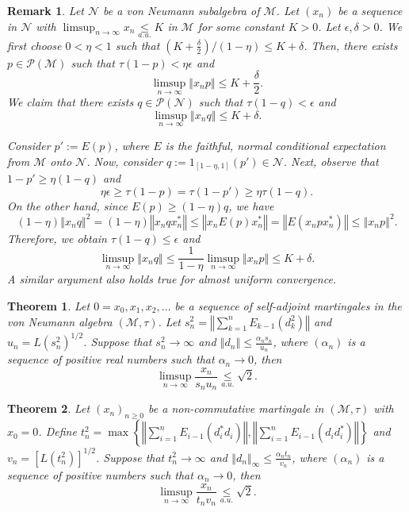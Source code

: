 \documentclass[10pt,a4paper]{amsart}
\newtheorem{rem}{Remark}
\newtheorem{thm}{Theorem}
\newcommand{\CM}{\mathcal{M}}
\newcommand{\CN}{\mathcal{N}}
\newcommand{\CP}{\mathcal{P}}
\newcommand{\auleq}{\underset{a.u.}{\leq }}
\newcommand{\norm}[1]{\left\Vert#1\right\Vert}
\begin{document}
\begin{rem}\label{rem: indep of ambient vna}
Let $\CN$ be a von Neumann subalgebra of $\CM$. Let $(x_n)$ be a sequence in $\CN$ with $\limsup_{n \to \infty} x_n \auleq K $ in $\CM$ for some constant $K>0$. Let $\epsilon, \delta>0$. We first choose $0< \eta <1$ such that $(K+ \frac{\delta}{2})/ (1-\eta) \leq K+ \delta$. Then, there exists $p \in \CP(\CM)$ such that $\tau(1-p)< \eta \epsilon$ and 
\[
\limsup_{n \to \infty} \norm{x_np} \leq K + \frac{\delta}{2}.
\]
We claim that there exists $q \in \CP(\CN)$ such that $\tau(1-q)< \epsilon$ and 
\[
\limsup_{n \to \infty} \norm{x_nq} \leq K + \delta.
\]


Consider $p':= E(p)$, where $E$ is the faithful, normal conditional expectation from $\CM$ onto $\CN$. Now, consider $q:= 1_{[1-\eta, 1]}(p')\in \CN$. Next, observe that $1- p' \geq \eta (1-q)$ and
\[
\eta \epsilon \geq \tau(1-p)= \tau(1-p') \geq \eta \tau(1-q).
\]
On the other hand, since $E(p)\geq (1-\eta) q$, we have \[
(1-\eta)\norm{x_nq}^2=(1-\eta)\norm{x_nqx_n^*} \leq  \norm{x_n E(p) x_n^*}=\norm{E(x_n p x_n^*)} \leq  \norm{x_np}^2.
\]
Therefore, we obtain $\tau(1-q) \leq \epsilon$ and
\[
\limsup_{n \to \infty} \norm{x_nq} \leq \frac{1}{1-\eta} \limsup_{n \to \infty} \norm{x_np} \leq K+ \delta.
\]
A similar argument also holds true for almost uniform convergence.
\end{rem}

\begin{thm}\label{thm: main thm}
    Let $0=x_0, x_1, x_2, \ldots$ be a sequence of self-adjoint martingales in the von Neumann algebra $(\mathcal{M}, \tau)$. Let $s_n^2=\norm{\sum_{k=1}^n E_{k-1}(d_k^2)}$ and $u_n=L(s_n^2)^{1/2}$. Suppose that $s_n^2 \to \infty$ and $\norm{d_n} \leq \frac{\alpha_n s_n}{u_n}$, where $(\alpha_n)$ is a sequence of positive {\color{blue} real} numbers such that $\alpha_n \to 0$, then 
    \[
    \limsup_{n \to \infty} \frac{x_n}{s_n u_n} \underset{a.u.}{\leq }\sqrt{2}.
    \]
\end{thm}

\begin{thm}\label{trick}
    Let $(x_n)_{n \geq 0}$ be a non-commutative martingale in $(\mathcal{M}, \tau)$ with $x_0 = 0$. Define \newline $t_n^2 = \max\left\{\norm{\sum_{i=1}^n E_{i-1}(d_i^*d_i)},\norm{\sum_{i=1}^n E_{i-1}(d_id_i^*)}\right\}$ and $v_n = [L(t_n^2)]^{1/2}$. Suppose that $t_n^2 \to \infty$ and $\norm{d_n}_\infty \leq \frac{\alpha_n t_n}{v_n}$, where $(\alpha_n)$ is a sequence of positive numbers such that $\alpha_n \to 0$, then 
    $$
    \limsup_{n \to \infty} \frac{x_n}{t_n v_n} \underset{a.u.}{\leq }\sqrt{2}.
    $$
\end{thm}
\end{document}
